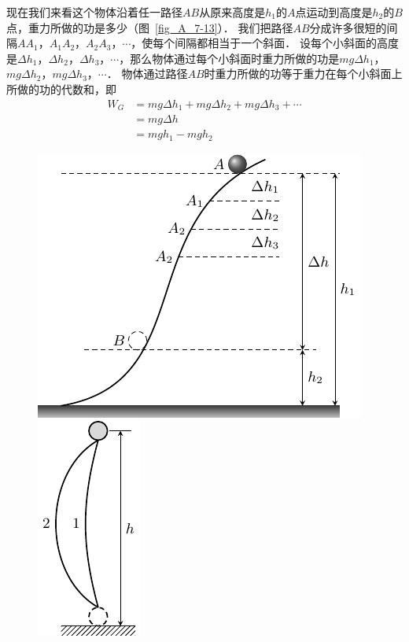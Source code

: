 现在我们来看这个物体沿着任一路径$AB$从原来高度是$h_1$的$A$点运动到高度是$h_2$的$B$点，重力所做的功是多少（图~\ref{fig_A_7-13}）．
我们把路径$AB$分成许多很短的间隔$AA_1 $，$ A_1A_2 $，$ A_2A_3 $，$ \cdots$，使每个间隔都相当于一个斜面．
设每个小斜面的高度是$\Delta h_1 $，$ \Delta h_2 $，$ \Delta h_3 $，$ \cdots$，那么物体通过每个小斜面时重力所做的功是$mg\Delta h_1 $，$ mg\Delta h_2 $，$ mg\Delta h_3 $，$ \cdots$．
物体通过路径$AB$时重力所做的功等于重力在每个小斜面上所做的功的代数和，即
\[\begin{split}
W_G&= mg\Delta h_1+mg\Delta h_2+mg\Delta h_3+\cdots\\
&=mg\Delta h\\
&=mgh_1-mgh_2
\end{split} \]


\begin{figure}[htbp]
	\centering
	\begin{minipage}[t]{0.55\linewidth}
		\centering
		\includegraphics{fig/A/7-13.pdf}
		\caption{}\label{fig_A_7-13}
	\end{minipage}
	\hfil
	\begin{minipage}[t]{0.35\linewidth}
		\centering
		\includegraphics{fig/A/7-14.pdf}
		\caption{}\label{fig_A_7-14}
	\end{minipage}
\end{figure}

